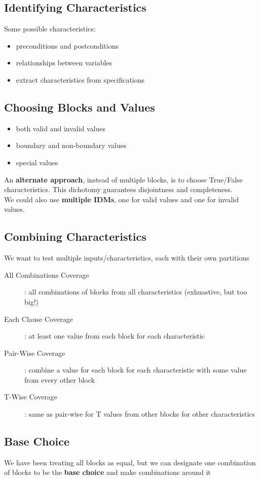 \documentclass[]{article}
\theoremstyle{definition}
\begin{document}
	\subsection{Identifying Characteristics}
	Some possible characteristics:
	\begin{itemize}
		\item preconditions and postconditions
		\item relationships between variables 
		\item extract characteristics from specifications
	\end{itemize}

	\subsection{Choosing Blocks and Values}
	\begin{itemize}
		\item both valid and invalid values
		\item boundary and non-boundary values
		\item special values
	\end{itemize}
	An \textbf{alternate approach}, instead of multiple blocks, is to choose True/False characteristics.
	This dichotomy guarantees disjointness and completeness. \\
	We could also use \textbf{multiple IDMs}, one for valid values and one for invalid values.

	\subsection{Combining Characteristics}
	We want to test multiple inputs/characteristics, each with their own partitions 
	
	\begin{description}
		\item[All Combinations Coverage]: all combinations of blocks from all characteristics (exhuastive, but too big!)
		\item[Each Clause Coverage]: at least one value from each block for each characteristic
		\item[Pair-Wise Coverage]: combine a value for each block for each characteristic with some value from every other block
		\item[T-Wise Coverage]: same as pair-wise for T values from other blocks for other characteristics
	\end{description}

	\subsection{Base Choice}
	We have been treating all blocks as equal, but we can designate one combination of blocks to be the \textbf{base choice}
	and make combinations around it



	
\end{document}
